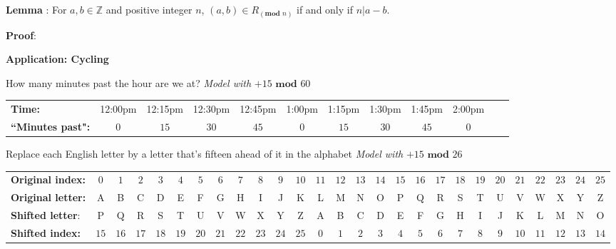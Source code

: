 \documentclass[12pt, oneside]{article}
\begin{document}
{\bf Lemma} : For $a, b \in \mathbb{Z}$ 
and positive integer $n$, $(a,b) \in R_{(\textbf{mod } n)}$ if and only if  $n | a-b$.

{\bf Proof}: 

\phantom{Consider arbitrary integers $a,b$ and arbitrary positive integer $n$.}



\vspace{200pt} 

{\bf Application: Cycling}

How many minutes past the hour are we at?  \hfill {\it Model with} $+15 \textbf{ mod } 60$

\begin{tabular}{lccccccccccc}
{\bf Time:} &12:00pm  &12:15pm&12:30pm  &12:45pm&1:00pm  &1:15pm&1:30pm  &1:45pm&2:00pm \\
{\bf ``Minutes past":} &$0$ & $15$ & $30$ & $45$ &$0$ & $15$ & $30$ & $45$ &$0$\\
\end{tabular}

\vspace{50pt}

Replace each English letter by a letter that's fifteen ahead of it in the alphabet
  \hfill {\it Model with} $+15 \textbf{ mod } 26$

{\tiny
\begin{tabular}{lcccccccccccccccccccccccccc}
{\bf Original index:} & $0$ & $1$
 & $2$ & $3$ &  $4$ & $5$ &  $6$ & $7$ &  $8$ & $9$ & $10$ & $11$ & $12$ & $13$ & $14$ & $15$ & 
  $16$ & $17$ &  $18$ & $19$ &  $20$ & $21$ &  $22$ & $23$ & $24$ & $25$\\
{\bf Original letter:} & A & B& C & D & E & F& G& H & I & J & K & L &M & N& O &P &Q & R & S & T & U & V & W & X & Y & Z \\
{\bf Shifted letter}: &P &Q & R & S & T & U & V & W & X & Y & Z & A & B& C & D & E & F& G& H & I & J & K & L &M & N& O \\
{\bf Shifted index:} &$15$ & 
  $16$ & $17$ &  $18$ & $19$ &  $20$ & $21$ &  $22$ & $23$ & $24$ & $25$ & $0$ & $1$
 & $2$ & $3$ &  $4$ & $5$ &  $6$ & $7$ &  $8$ & $9$ & $10$ & $11$ & $12$ & $13$ & $14$ 
\end{tabular}
} 
\end{document}
